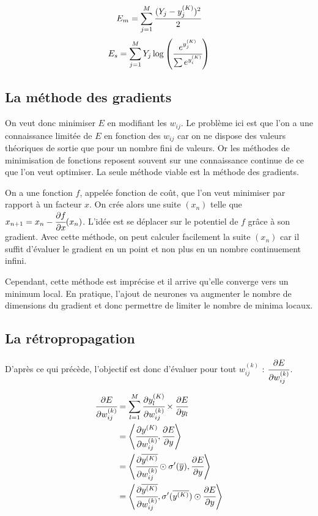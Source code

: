 \[E_m = \sum_{j = 1}^{M} \cfrac{(Y_j - y_j^{(K)})^2}{2}\]
\[E_s = \sum_{j = 1}^{M} Y_j \log \left(\cfrac{e^{y_j^{(K)}}}{\sum e^{y_i^{(K)}}}\right)\]

\subsection{La méthode des gradients}

On veut donc minimiser $E$ en modifiant les $w_{ij}$. Le problème ici est que
l'on a une connaissance limitée de $E$ en fonction des $w_{ij}$ car on ne
dispose des valeurs théoriques de sortie que pour un nombre fini de valeurs. Or
les méthodes de minimisation de fonctions reposent souvent sur une connaissance
continue de ce que l'on veut optimiser. La seule méthode viable est la méthode
des gradients.

\medskip

On a une fonction $f$, appelée fonction de coût, que l'on veut minimiser par
rapport à un facteur $x$. On crée alors une suite $(x_n)$ telle que
$x_{n+1} = x_{n} - \cfrac{\partial f}{\partial x}(x_n)$.
L'idée est se déplacer sur le potentiel de $f$ grâce à son gradient. Avec cette
méthode, on peut calculer facilement la suite $(x_n)$ car il suffit d'évaluer
le gradient en un point et non plus en un nombre continuement infini.

\medskip

Cependant, cette méthode est imprécise et il arrive qu'elle converge vers un
minimum local. En pratique, l'ajout de neurones va augmenter le nombre de
dimensions du gradient et donc permettre de limiter le nombre de minima locaux.

\medskip

\subsection{La rétropropagation}

D'après ce qui précède, l'objectif est donc d'évaluer pour tout $w_{ij}^{(k)}$ :
 $\cfrac{\partial E}{\partial w_{ij}^{(k)}}$.

\begin{align*}
\cfrac{\partial E}{\partial w_{ij}^{(k)}} &= \sum_{l = 1}^{M} \cfrac{\partial y_l^{(K)}}{\partial w_{ij}^{(k)}} \times \cfrac{\partial E}{\partial y_l}\\
&= \left\langle\cfrac{\partial y^{(K)}}{\partial w_{ij}^{(k)}},\cfrac{\partial E}{\partial y}\right\rangle\\
&= \left\langle\cfrac{\partial \overline{y^{(K)}}}{\partial w_{ij}^{(k)}} \odot \sigma'(\overline{y}),\cfrac{\partial E}{\partial y}\right\rangle \\
&= \left\langle\cfrac{\partial \overline{y^{(K)}}}{\partial w_{ij}^{(k)}} ,\sigma'(\overline{y^{(K)}}) \odot \cfrac{\partial E}{\partial y}\right\rangle
\end{align*}

